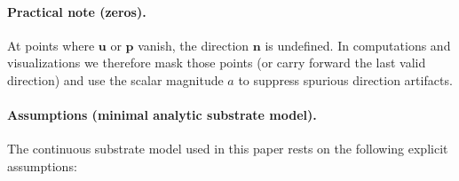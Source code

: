 \paragraph{Practical note (zeros).}
At points where $\mathbf u$ or $\mathbf p$ vanish, the direction
$\mathbf n$ is undefined. In computations and visualizations we therefore mask
those points (or carry forward the last valid direction) and use the scalar
magnitude $a$ to suppress spurious direction artifacts.

\paragraph{Assumptions (minimal analytic substrate model).}
The continuous substrate model used in this paper rests on the following explicit assumptions:

